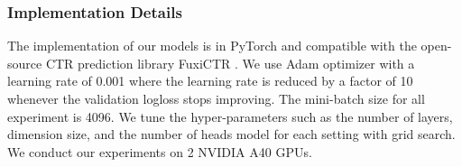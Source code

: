 \documentclass{article}
\begin{document}
\subsubsection{Implementation Details}

The implementation of our models is in PyTorch and compatible with the open-source CTR prediction library FuxiCTR \cite{barsctr}. We use Adam optimizer with a learning rate of 0.001 where the learning rate is reduced by a factor of 10 whenever the validation logloss stops improving. The mini-batch size for all experiment is 4096. We tune the hyper-parameters such as the number of layers, dimension size, and the number of heads model for each setting with grid search. We conduct our experiments on 2 NVIDIA A40 GPUs.

\begin{table}[t]
\caption{Performance comparisons on Avazu and Criteo datasets w.r.t. AUC and Logloss. The best results are in \textbf{bold} and the second best results are reported in \textit{italics}.}
\label{table:sota}
\end{table}
\end{document}
